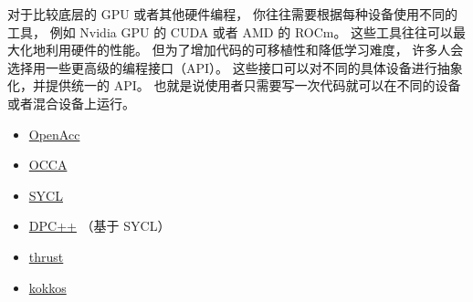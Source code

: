 
\begin{issues}
\issueDraft
\end{issues}

对于比较底层的 GPU 或者其他硬件编程， 你往往需要根据每种设备使用不同的工具， 例如 Nvidia GPU 的 CUDA 或者 AMD 的 ROCm。 这些工具往往可以最大化地利用硬件的性能。 但为了增加代码的可移植性和降低学习难度， 许多人会选择用一些更高级的编程接口（API）。 这些接口可以对不同的具体设备进行抽象化，并提供统一的 API。 也就是说使用者只需要写一次代码就可以在不同的设备或者混合设备上运行。

\begin{itemize}
\item \href{https://www.openacc.org/}{OpenAcc}
\item \href{https://libocca.org/}{OCCA}
\item \href{https://www.khronos.org/api/index_2017/sycl}{SYCL}
\item \href{https://www.intel.com/content/www/us/en/developer/tools/oneapi/dpc-compiler.html#gs.5ytas2}{DPC++} （基于 SYCL）
\item \href{https://developer.nvidia.com/thrust}{thrust}
\item \href{https://kokkos.github.io/}{kokkos}
\end{itemize}

